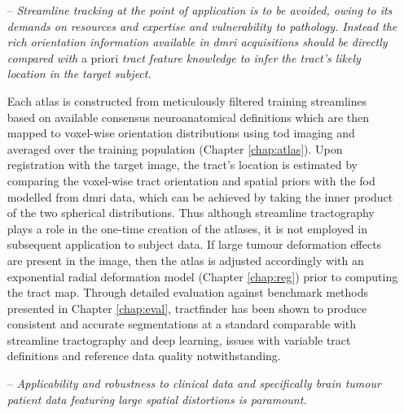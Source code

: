 \documentclass[12pt,phd,a4paper,twoside]{ucl_thesis}
\providecommand{\DIFaddtex}[1]{{\protect\color{blue} \sf #1}} %
\providecommand{\DIFaddbegin}{} %
\providecommand{\DIFaddend}{} %
\providecommand{\DIFadd}[1]{\texorpdfstring{\DIFaddtex{#1}}{#1}} %
\newcommand{\DIFaddincludegraphics}[2][]{{\color{blue}\fbox{\DIFOincludegraphics[#1]{#2}}}} %
\DeclareRobustCommand{\DIFaddbegin}{\DIFOaddbegin \let\includegraphics\DIFaddincludegraphics} %
\DeclareRobustCommand{\DIFaddend}{\DIFOaddend \let\includegraphics\DIFOincludegraphics} %
\begin{document}
\begin{itemize}


\item[\DIFadd{--}]\DIFadd{\textit{Streamline tracking at the point of application is to be avoided, owing to its demands on resources and expertise and vulnerability to pathology.
Instead the rich orientation information available in \gls{dmri} acquisitions should be directly compared with} a priori \textit{tract feature knowledge to infer the tract's likely location in the target subject.}
}

\DIFaddend Each atlas is constructed from meticulously filtered training streamlines based on available consensus neuroanatomical definitions which are then mapped to voxel-wise orientation distributions using \gls{tod} imaging and averaged over the training population (Chapter \ref{chap:atlas}).
Upon registration with the target image, the tract's location is estimated by comparing the voxel-wise tract orientation and spatial priors with the \gls{fod} modelled from \gls{dmri} data, which can be achieved by taking the inner product of the two spherical distributions.
\DIFaddbegin \DIFadd{Thus although streamline tractography plays a role in the one-time creation of the atlases, it is not employed in subsequent application to subject data.
}\DIFaddend If large tumour deformation effects are present in the image, then the atlas is adjusted accordingly with an exponential radial deformation model (Chapter \ref{chap:reg}) prior to computing the tract map.
Through detailed evaluation against benchmark methods presented in Chapter \ref{chap:eval}, tractfinder has been shown to produce consistent and accurate segmentations at a standard comparable with streamline tractography and deep learning, issues with variable tract definitions and reference data quality notwithstanding.

\DIFaddbegin \item[\DIFadd{--}]\DIFadd{\textit{Applicability and robustness to clinical data and specifically brain tumour patient data featuring large spatial distortions is paramount.}
}


\end{itemize}
\end{document}
